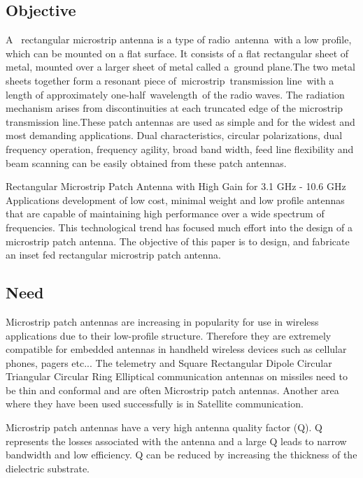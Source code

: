 \documentclass[12pt]{article}
\begin{document}
\subsection{Objective}\label{subs:Objective}
 \justify
   A  rectangular microstrip antenna is a type of radio antenna with a low profile, which can be mounted on a flat surface. It consists of a flat rectangular sheet of metal, mounted over a larger sheet of metal called a ground plane.The two metal sheets together form a resonant piece of microstrip transmission line with a length of approximately one-half wavelength of the radio waves. The radiation mechanism arises from discontinuities at each truncated edge of the microstrip transmission line.These patch antennas are used as simple and for the widest and most demanding applications. Dual characteristics, circular polarizations, dual frequency operation, frequency agility, broad band width, feed line flexibility and beam scanning can be easily obtained from these patch antennas.

 \justify
  Rectangular Microstrip Patch Antenna with High Gain for 3.1 GHz - 10.6 GHz Applications development of low cost, minimal weight and low profile antennas that are capable of maintaining high performance over a wide spectrum of frequencies. This technological trend has focused much effort into the design of a microstrip patch antenna. The objective of this paper is to design, and fabricate an inset fed rectangular microstrip patch antenna.

\subsection{Need}\label{sub:Need}
 \justify
   Microstrip patch antennas are increasing in popularity for use in wireless applications due to their low-profile structure. Therefore they are extremely compatible for embedded antennas in handheld wireless devices such as cellular phones, pagers etc... The telemetry and Square Rectangular Dipole Circular Triangular Circular Ring Elliptical communication antennas on missiles need to be thin and conformal and are often Microstrip patch antennas. Another area where they have been used successfully is in Satellite communication.

 \justify
   Microstrip patch antennas have a very high antenna quality factor (Q). Q represents the losses associated with the antenna and a large Q leads to narrow bandwidth and low efficiency. Q can be reduced by increasing the thickness of the dielectric substrate.
\end{document}
